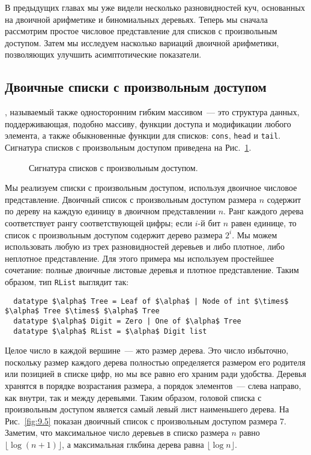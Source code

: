 В предыдущих главах мы уже видели несколько разновидностей куч,
основанных на двоичной арифметике и биномиальных деревьях. Теперь мы
сначала рассмотрим простое числовое представление для списков с
произвольным доступом. Затем мы исследуем насколько вариаций двоичной
арифметики, позволяющих улучшить асимптотические показатели.

\subsection{Двоичные списки с произвольным доступом}
\label{sc:9.2.1}

, называемый
также односторонним гибким массивом~--- это структура данных,
поддерживающая, подобно массиву, функции доступа и модификации любого
элемента, а также обыкновенные функции для списков: \lstinline!cons!,
\lstinline!head! и \lstinline!tail!. Сигнатура списков с произвольным
доступом приведена на Рис.~\ref{fig:9.4}.

\begin{figure}
  \centering
  
  \caption{Сигнатура списков с произвольным доступом.}
  \label{fig:9.4}
\end{figure}

Мы реализуем списки с произвольным доступом, используя двоичное
числовое представление. Двоичный список с произвольным доступом
размера $n$ содержит по дереву на каждую единицу в двоичном
представлении $n$. Ранг каждого дерева соответствует рангу
соответствующей цифры; если $i$-й бит $n$ равен единице, то список с
произвольным доступом содержит дерево размера $2^i$. Мы можем
использовать любую из трех разновидностей деревьев и либо плотное,
либо неплотное представление. Для этого примера мы используем
простейшее сочетание: полные двоичные листовые деревья и плотное
представление. Таким образом, тип \lstinline!RList! выглядит так:
\begin{lstlisting}
  datatype $\alpha$ Tree = Leaf of $\alpha$ | Node of int $\times$ $\alpha$ Tree $\times$ $\alpha$ Tree
  datatype $\alpha$ Digit = Zero | One of $\alpha$ Tree
  datatype $\alpha$ RList = $\alpha$ Digit list
\end{lstlisting}
Целое число в каждой вершине~--- жто размер дерева. Это число
избыточно, поскольку размер каждого дерева полностью определяется
размером его родителя или позицией в списке цифр, но мы все равно его
храним ради удобства. Деревья хранятся в порядке возрастания размера,
а порядок элементов~--- слева направо, как внутри, так и между
деревьями. Таким образом, головой списка с произвольным доступом
является самый левый лист наименьшего дерева. На Рис.~\ref{fig:9.5}
показан двоичный список с произвольным доступом размера 7. Заметим,
что максимальное число деревьев в списко размера $n$ равно 
$\lfloor \log (n+1) \rfloor$, а максимальная глкбина дерева равна 
$\lfloor \log n \rfloor$.

